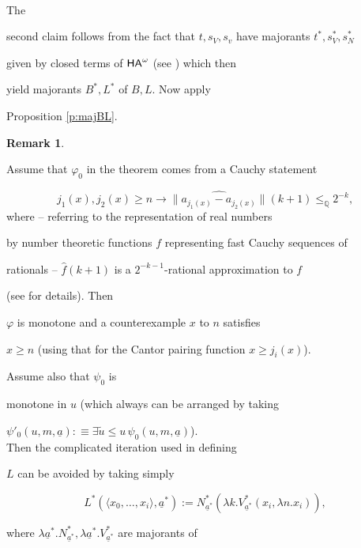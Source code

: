 \documentclass[1p]{elsarticle}
\newcommand{\usftext}[1]{\textsf{\upshape #1}}
\newcommand{\QQ}{\ensuremath{\mathbb{Q}}}
\newcommand{\ha}{\ensuremath{{\usftext{HA}}^\omega}} %
\theoremstyle{plain}
\theoremstyle{definition}
\newtheorem{rmk}[thm]{Remark}
\theoremstyle{remark}
\renewenvironment{proof}[1][]{\noindent{\bf Proof{#1}. }}{\nopagebreak[4]{\hspace*{\fill}


  $\Box$              %

 }{\vspace{2ex}}}
\theoremstyle{definition}
\begin{document}
{\begin{proof}
\\ The 

second claim follows from the fact that $t,s_V,s_v$ have majorants $t^*,

s^*_V,s^*_N$ 

given by closed terms of $\ha$ (see \cite{Kohlenbach(book)}) which then 

yield majorants $B^*,L^*$ of $B,L.$ Now apply  

Proposition \ref{p:majBL}.

\end{proof} 

\begin{rmk} \label{simple-L}

Assume that $\varphi_0$  in the theorem comes from a Cauchy statement 

\[ j_1(x),j_2(x)\ge n\to \widehat{\| 

a_{j_1(x)}-a_{j_2(x)}\|}(k+1)\le_{\QQ} 

2^{-k}, \] where -- referring to the representation of real numbers 

by number theoretic functions $f$ representing fast Cauchy sequences of 

rationals -- $\widehat{f}(k+1)$ is a $2^{-k-1}$-rational approximation to $f$ 

(see \cite{Kohlenbach(book)} for details).  Then 

$\varphi$ is monotone and a counterexample $x$ to $n$ satisfies 

$x\ge n$ (using that for the Cantor pairing function $x\ge j_i(x)$). 

Assume also that $\psi_0$ is 

monotone in $u$ (which always can be arranged by taking 

$\psi'_0(u,m,\underline{a}):\equiv \exists \tilde{u}\le u\,\psi_0

(u,m,\underline{a})$). \\ 

Then the complicated iteration used in defining 

$L$ can be avoided by taking simply 

\[ L^*(\langle x_0,\ldots,x_i\rangle,\underline{a}^*):= 

N^*_{\underline{a}^*}(\lambda k.V^*_{\underline{a}^*}(x_i,

\lambda n.x_i)), \] 

where $\lambda \underline{a}^*.N^*_{\underline{a}^*},\lambda \underline{a}^*.

V^*_{\underline{a}^*}$ are majorants of 


\end{rmk}}
\end{document}
